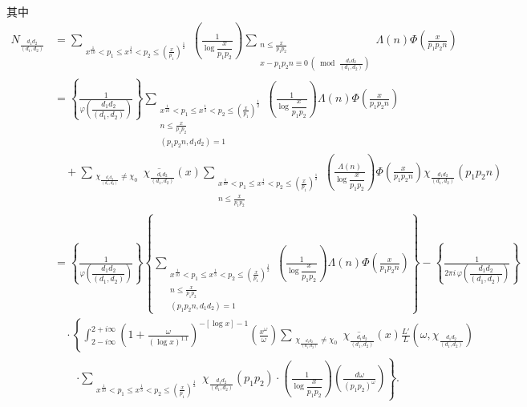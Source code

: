 其中
\begin{align*}
N_{\frac{d_1d_2}{(d_1,d_2)}}
&=\sum_{\substack{x^{\frac1{10}}<p_1\leqslant x^{\frac13}<p_2\leqslant(\frac{x}{p_1})^{\frac12}}}
\left(\frac{1}{\log\dfrac{x}{p_1p_2}}\right)
\sum_{\substack{n\leqslant\frac{x}{p_1p_2}\\x-p_1p_2n\equiv0\,\left(\bmod\frac{d_1d_2}{(d_1,d_2)}\right)}}
\Lambda(n)\Phi\left(\frac{x}{p_1p_2n}\right)\\
&=\left\{\frac{1}{\varphi\left(\dfrac{d_1d_2}{(d_1,d_2)}\right)}\right\}
\sum_{\substack{x^{\frac1{10}}<p_1\leqslant x^{\frac13}<p_2\leqslant(\frac{x}{p_1})^{\frac12}\\n\leqslant\frac{x}{p_1p_2}\\(p_1p_2n,d_1d_2)=1}}
\left(\frac{1}{\log\dfrac{x}{p_1p_2}}\right)
\Lambda(n)\Phi\left(\frac{x}{p_1p_2n}\right)\\
&\quad+\sum_{\substack{\chi_{\frac{d_1d_2}{(d_1,d_2)}}\neq\chi_0}}
\overline{\chi_{\frac{d_1d_2}{(d_1,d_2)}}}(x)
\sum_{\substack{x^{\frac1{10}}<p_1\leqslant x^{\frac13}<p_2\leqslant(\frac{x}{p_1})^{\frac12}\\n\leqslant\frac{x}{p_1p_2}}}
\left(\frac{\Lambda(n)}{\log\dfrac{x}{p_1p_2}}\right)
\Phi\left(\frac{x}{p_1p_2n}\right)
\chi_{\frac{d_1d_2}{(d_1,d_2)}}(p_1p_2n)\\
&=\left\{\frac{1}{\varphi\left(\dfrac{d_1d_2}{(d_1,d_2)}\right)}\right\}
\left\{
\sum_{\substack{x^{\frac1{10}}<p_1\leqslant x^{\frac13}<p_2\leqslant(\frac{x}{p_1})^{\frac12}\\n\leqslant\frac{x}{p_1p_2}\\(p_1p_2n,d_1d_2)=1}}
\left(\frac{1}{\log\dfrac{x}{p_1p_2}}\right)
\Lambda(n)\Phi\left(\frac{x}{p_1p_2n}\right)
\right\}
-\left\{\frac{1}{2\pi i\,\varphi\left(\dfrac{d_1d_2}{(d_1,d_2)}\right)}\right\}\\
&\quad\cdot\left\{\int_{2-i\infty}^{2+i\infty}
\left(1+\frac{\omega}{(\log x)^{1.1}}\right)^{-[\log x]-1}
\left(\frac{x^\omega}{\omega}\right)
\sum_{\substack{\chi_{\frac{d_1d_2}{(d_1,d_2)}}\neq\chi_0}}
\overline{\chi_{\frac{d_1d_2}{(d_1,d_2)}}}(x)
\frac{L'}{L}(\omega,\chi_{\frac{d_1d_2}{(d_1,d_2)}})\right.\\
&\qquad\left.\cdot\sum_{\substack{x^{\frac1{10}}<p_1\leqslant x^{\frac13}<p_2\leqslant(\frac{x}{p_1})^{\frac12}}}
\chi_{\frac{d_1d_2}{(d_1,d_2)}}(p_1p_2)\cdot
\left(\frac{1}{\log\dfrac{x}{p_1p_2}}\right)
\left(\frac{d\omega}{(p_1p_2)^\omega}\right)\right\}.\tag{6}
\end{align*}
